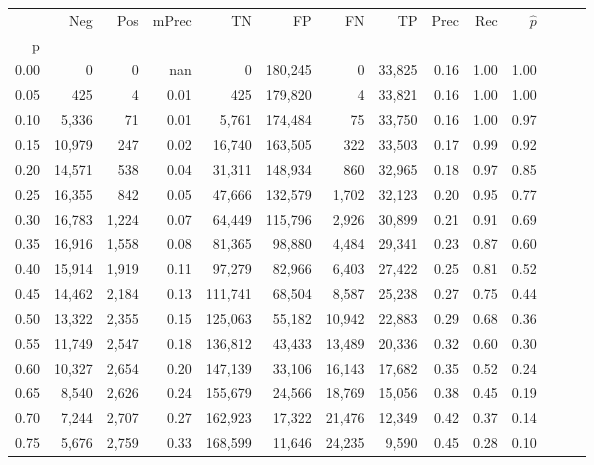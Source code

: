\begin{tabular}{rrrrrrrrrrrrrr}
\toprule
{} &     Neg &    Pos & mPrec &       TN &       FP &      FN &      TP &  Prec &   Rec & $\hat{p}$ \\
p    &         &        &       &          &          &         &         &       &       &           \\
\midrule
0.00 &       0 &      0 &   nan &        0 &  180,245 &       0 &  33,825 &  0.16 &  1.00 &      1.00 \\
0.05 &     425 &      4 &  0.01 &      425 &  179,820 &       4 &  33,821 &  0.16 &  1.00 &      1.00 \\
0.10 &   5,336 &     71 &  0.01 &    5,761 &  174,484 &      75 &  33,750 &  0.16 &  1.00 &      0.97 \\
0.15 &  10,979 &    247 &  0.02 &   16,740 &  163,505 &     322 &  33,503 &  0.17 &  0.99 &      0.92 \\
0.20 &  14,571 &    538 &  0.04 &   31,311 &  148,934 &     860 &  32,965 &  0.18 &  0.97 &      0.85 \\
0.25 &  16,355 &    842 &  0.05 &   47,666 &  132,579 &   1,702 &  32,123 &  0.20 &  0.95 &      0.77 \\
0.30 &  16,783 &  1,224 &  0.07 &   64,449 &  115,796 &   2,926 &  30,899 &  0.21 &  0.91 &      0.69 \\
0.35 &  16,916 &  1,558 &  0.08 &   81,365 &   98,880 &   4,484 &  29,341 &  0.23 &  0.87 &      0.60 \\
0.40 &  15,914 &  1,919 &  0.11 &   97,279 &   82,966 &   6,403 &  27,422 &  0.25 &  0.81 &      0.52 \\
0.45 &  14,462 &  2,184 &  0.13 &  111,741 &   68,504 &   8,587 &  25,238 &  0.27 &  0.75 &      0.44 \\
0.50 &  13,322 &  2,355 &  0.15 &  125,063 &   55,182 &  10,942 &  22,883 &  0.29 &  0.68 &      0.36 \\
0.55 &  11,749 &  2,547 &  0.18 &  136,812 &   43,433 &  13,489 &  20,336 &  0.32 &  0.60 &      0.30 \\
0.60 &  10,327 &  2,654 &  0.20 &  147,139 &   33,106 &  16,143 &  17,682 &  0.35 &  0.52 &      0.24 \\
0.65 &   8,540 &  2,626 &  0.24 &  155,679 &   24,566 &  18,769 &  15,056 &  0.38 &  0.45 &      0.19 \\
0.70 &   7,244 &  2,707 &  0.27 &  162,923 &   17,322 &  21,476 &  12,349 &  0.42 &  0.37 &      0.14 \\
0.75 &   5,676 &  2,759 &  0.33 &  168,599 &   11,646 &  24,235 &   9,590 &  0.45 &  0.28 &      0.10 \\

\end{tabular}
